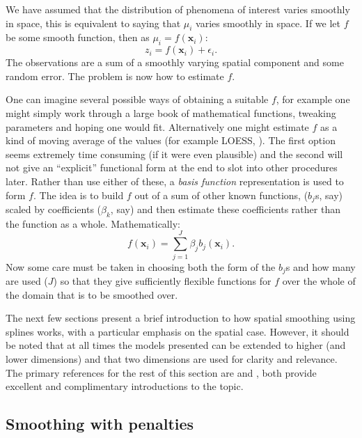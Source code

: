 We have assumed that the distribution of phenomena of interest varies smoothly in space, this is equivalent to saying that $\mu_i$ varies smoothly in space. If we let $f$ be some smooth function, then as $\mu_i = f(\mathbf{x}_i)$:
\begin{equation}
z_i = f(\mathbf{x}_i) + \epsilon_i.
\end{equation}
The observations are a sum of a smoothly varying spatial component and some random error. The problem is now how to estimate $f$.

One can imagine several possible ways of obtaining a suitable $f$, for example one might simply work through a large book of mathematical functions, tweaking parameters and hoping one would fit. Alternatively one might estimate $f$ as a kind of moving average of the values (for example LOESS, \cite{loess2}). The first option seems extremely time consuming (if it were even plausible) and the second will not give an ``explicit'' functional form at the end to slot into other procedures later. Rather than use either of these, a \textit{basis function} representation is used to form $f$. The idea is to build $f$ out of a sum of other known functions, ($b_j$s, say) scaled by coefficients ($\beta_k$, say) and then estimate these coefficients rather than the function as a whole. Mathematically:
\begin{equation}
 f(\mathbf{x}_{i}) = \sum_{j=1}^J \beta_j b_j(\mathbf{x}_{i}).
\label{intro-basisdecomp}
\end{equation}
Now some care must be taken in choosing both the form of the $b_j$s and how many are used ($J$) so that they give sufficiently flexible functions for $f$ over the whole of the domain that is to be smoothed over. 

The next few sections present a brief introduction to how spatial smoothing using splines works, with a particular emphasis on the spatial case. However, it should be noted that at all times the models presented can be extended to higher (and lower dimensions) and that two dimensions are used for clarity and relevance. The primary references for the rest of this section are  and , both provide excellent and complimentary introductions to the topic.

\subsection{Smoothing with penalties}
\label{GAMpenalties}


